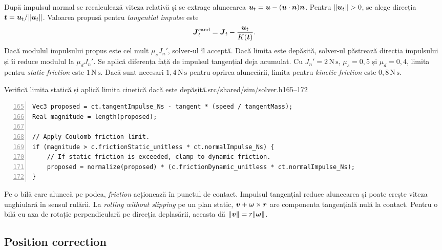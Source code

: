 \documentclass[11pt,a4paper]{article}
\begin{document}
După impulsul normal se recalculează viteza relativă și se
extrage alunecarea
\(\boldsymbol{u}_t=\boldsymbol{u}-(\boldsymbol{u}\cdot\boldsymbol{n})\boldsymbol{n}\).
Pentru \(\|\vect u_t\|>0\), se alege direcția
\(\boldsymbol{t}=\boldsymbol{u}_t/\|\boldsymbol{u}_t\|\). Valoarea propusă pentru \emph{tangential impulse} este
\begin{equation}
 \boldsymbol{J}_t^{\mathrm{cand}}=
 \boldsymbol{J}_t-\frac{\boldsymbol{u}_t}{K(\boldsymbol{t})}.
\end{equation}
Dacă modulul impulsului propus este cel mult \(\mu_sJ_n'\),
solver-ul îl acceptă. Dacă limita este depășită, solver-ul păstrează
direcția impulsului și îi reduce modulul la \(\mu_dJ_n'\).
Se aplică diferența față de impulsul tangențial deja acumulat.
Cu \(J_n'=2\,\mathrm{N\,s}\), \(\mu_s=0{,}5\) și
\(\mu_d=0{,}4\), limita pentru \emph{static friction} este \(1\,\mathrm{N\,s}\).
Dacă sunt necesari \(1{,}4\,\mathrm{N\,s}\) pentru oprirea
alunecării, limita pentru \emph{kinetic friction} este \(0{,}8\,\mathrm{N\,s}\).
\begin{codefragment}{Verifică limita statică și aplică limita cinetică dacă este depășită.}{src/shared/sim/solver.h}{165--172}
\begin{lstlisting}[numbers=left,firstnumber=165]
Vec3 proposed = ct.tangentImpulse_Ns - tangent * (speed / tangentMass);
Real magnitude = length(proposed);

// Apply Coulomb friction limit.
if (magnitude > c.frictionStatic_unitless * ct.normalImpulse_Ns) {
    // If static friction is exceeded, clamp to dynamic friction.
    proposed = normalize(proposed) * (c.frictionDynamic_unitless * ct.normalImpulse_Ns);
}
\end{lstlisting}
\end{codefragment}

Pe o bilă care alunecă pe podea, \emph{friction} acționează în
punctul de contact. Impulsul tangențial reduce alunecarea și poate
crește viteza unghiulară în sensul rulării. La \emph{rolling without slipping} pe un plan static,
\(\boldsymbol{v}+\boldsymbol{\omega}\times\boldsymbol{r}\) are componenta tangențială
nulă la contact. Pentru o bilă cu axa de rotație perpendiculară
pe direcția deplasării, aceasta dă \(\|\boldsymbol{v}\|=r\|\boldsymbol{\omega}\|\).

\subsection{Position correction}
\end{document}
